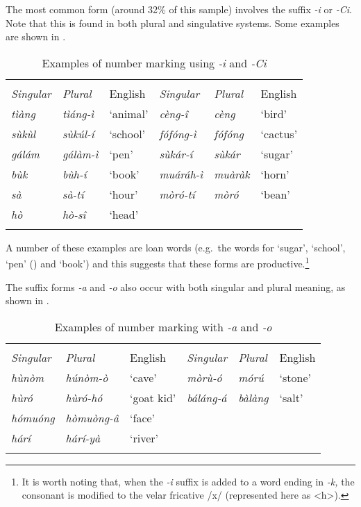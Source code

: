 \documentclass[output=paper]{langsci/langscibook}
\begin{document}
\newpage 
The most common form (around 32\% of this sample) involves the suffix \textit{-i} or \textit{-Ci}. Note that this is found in both plural and singulative systems. Some examples are shown in .  

\begin{table}[t]
\begin{tabularx}{\textwidth}{>{\itshape}X>{\itshape}XX>{\itshape}X>{\itshape}XX}
\lsptoprule

\multicolumn{3}{c}{ \textup{Plurative}} & \multicolumn{3}{c}{ \textup{Singulative}}\\ \cmidrule(lr){1-3}\cmidrule(lr){4-6}
 \textup{Singular} & \textup{Plural} & {English} & \textup{Singular} & \textup{Plural} & {English}\\ \midrule
 tìàng &  tìáng-ì & ‘animal’ &  cèng-î &  cèng & ‘bird’\\
 sùkùl &  sùkúl-í & ‘school’ &  fófóng-ì &  fófóng & ‘cactus’\\
 gálám &  gálàm-ì & ‘pen’ &  sùkár-í &  sùkár & ‘sugar’\\
 bùk &  bùh-í & ‘book’ &  muáráh-ì &  muàràk & ‘horn’\\
 sà &  sà-tí & ‘hour’ &  mòró-tí &  mòró & ‘bean’\\
 hò &  hò-sî & ‘head’ &  &  & \\
\lspbottomrule
\end{tabularx}
\caption{Examples of number marking using \textit{-i} and \textit{-Ci}}
\label{tab:moodie:10}
\end{table}

A number of these examples are loan words (e.g.\ the words for ‘sugar’, ‘school’, ‘pen’ () and ‘book’) and this suggests that these forms are productive.\footnote{It is worth noting that, when the \textit{-i} suffix is added to a word ending in \textit{-k,} the consonant is modified to the velar fricative /x/ (represented here as <h>).} 
 
The suffix forms \textit{-a }and \textit{-o} also occur with both singular and plural meaning, as shown in . 

\begin{table}
\begin{tabularx}{\textwidth}{>{\itshape}X>{\itshape}lX>{\itshape}X>{\itshape}XX}
\lsptoprule

\multicolumn{3}{c}{ \textup{Plural}} & \multicolumn{3}{c}{ \textup{Singulative}}\\ \cmidrule(lr){1-3}\cmidrule(lr){4-6}
 \textup{Singular} & \textup{Plural} & {English} & \textup{Singular} & \textup{Plural} & {English}\\ \midrule
 hùnòm &  húnòm-ò & ‘cave’ &  mòrù-ó &  mórú & ‘stone’\\
 hùró &  hùró-hó & ‘goat kid’ &  báláng-á &  bàlàng & ‘salt’\\
 hómuóng &  hòmuòng-\^{a} & ‘face’ &  &  & \\
 hárí &  hárí-yà & ‘river’ &  &  & \\
\lspbottomrule
\end{tabularx}
\caption{Examples of number marking with \textit{-a} and \textit{-o}} 
\label{tab:moodie:11}
\end{table}
\end{document}
